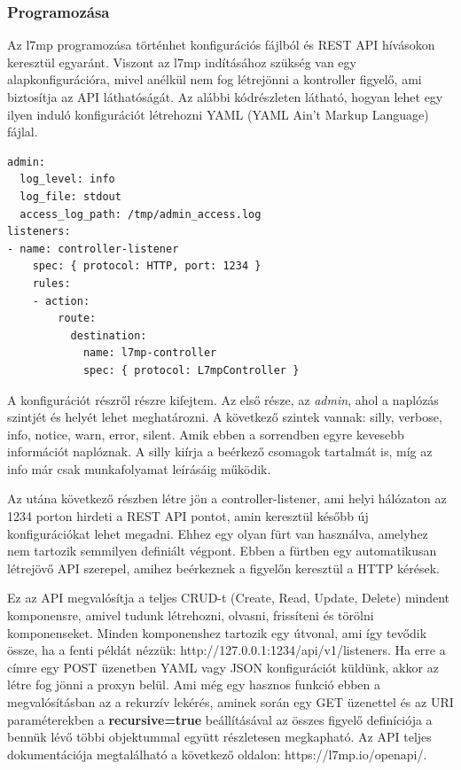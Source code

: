 \subsubsection{Programozása}

Az l7mp programozása történhet konfigurációs fájlból és REST API hívásokon keresztül
egyaránt. Viszont az l7mp indításához szükség van egy alapkonfigurációra, mivel
anélkül nem fog létrejönni a kontroller figyelő, ami biztosítja az API 
láthatóságát. Az alábbi kódrészleten látható, hogyan lehet egy ilyen induló konfigurációt
létrehozni YAML (YAML Ain't Markup Language) fájlal.

\begin{lstlisting}
admin:
  log_level: info
  log_file: stdout
  access_log_path: /tmp/admin_access.log
listeners:
- name: controller-listener
	spec: { protocol: HTTP, port: 1234 }
	rules:
    - action:
        route:
          destination:
            name: l7mp-controller
            spec: { protocol: L7mpController }
\end{lstlisting}

A konfigurációt részről részre kifejtem. Az első része, az \textit{admin}, ahol
a naplózás szintjét és helyét lehet meghatározni. A következő szintek vannak:
silly, verbose, info, notice, warn, error, silent. Amik ebben a sorrendben
egyre kevesebb információt naplóznak. A silly kiírja a beérkező csomagok tartalmát
is, míg az info már csak munkafolyamat leírásáig működik.

Az utána következő részben létre jön a controller-listener, ami helyi hálózaton az 
1234 porton hirdeti a REST API pontot, amin keresztül később új konfigurációkat lehet 
megadni. Ehhez egy olyan fürt van használva, amelyhez nem tartozik semmilyen definiált
végpont. Ebben a fürtben egy automatikusan létrejövő API szerepel, amihez beérkeznek 
a figyelőn keresztül a HTTP kérések. 

Ez az API megvalósítja a teljes CRUD-t (Create, Read, Update, Delete) mindent komponensre, 
amivel tudunk létrehozni, olvasni, frissíteni és törölni komponenseket. Minden komponenshez
tartozik egy útvonal, ami így tevődik össze, ha a fenti példát nézzük: http://127.0.0.1:1234/api/v1/listeners. Ha erre a címre egy POST üzenetben YAML vagy 
JSON konfigurációt küldünk, akkor az létre fog jönni a proxyn belül. Ami még egy 
hasznos funkció ebben a megvalósításban az a rekurzív lekérés, aminek során egy GET 
üzenettel és az URI paraméterekben a \textbf{recursive=true} beállításával az összes
figyelő definíciója a bennük lévő többi objektummal együtt részletesen megkapható. Az API 
teljes dokumentációja megtalálható a következő oldalon: https://l7mp.io/openapi/. \\


